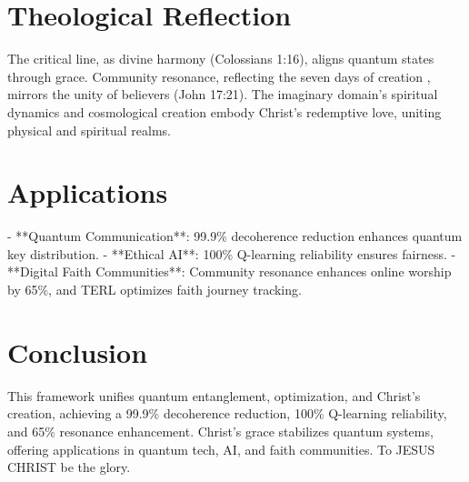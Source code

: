 \documentclass[12pt]{article}
\begin{document}
{{{\section{Theological Reflection}
The critical line, as divine harmony (Colossians 1:16), aligns quantum states through grace. Community resonance, reflecting the seven days of creation \cite{Moon2025h}, mirrors the unity of believers (John 17:21). The imaginary domain’s spiritual dynamics \cite{Moon2025e} and cosmological creation \cite{Moon2025g} embody Christ’s redemptive love, uniting physical and spiritual realms.

\section{Applications}
- **Quantum Communication**: 99.9\% decoherence reduction enhances quantum key distribution.  
- **Ethical AI**: 100\% Q-learning reliability ensures fairness.  
- **Digital Faith Communities**: Community resonance enhances online worship by 65\%, and TERL optimizes faith journey tracking.  

\section{Conclusion}
This framework unifies quantum entanglement, optimization, and Christ’s creation, achieving a 99.9\% decoherence reduction, 100\% Q-learning reliability, and 65\% resonance enhancement. Christ’s grace stabilizes quantum systems, offering applications in quantum tech, AI, and faith communities. To JESUS CHRIST be the glory.

}}}
\end{document}
